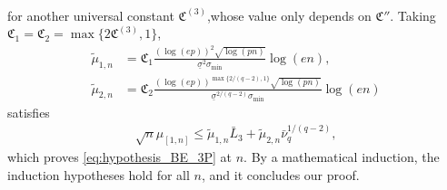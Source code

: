\documentclass[aos]{imsart}
\begin{document}
\begin{appendix}
\begin{equation*}
\begin{aligned}
\end{aligned}
\end{equation*}
for another universal constant $\mathfrak{C}^{(3)}$,whose value only depends on $\mathfrak{C}''$.
Taking $\mathfrak{C}_1 = \mathfrak{C}_2 = \max\{2 \mathfrak{C}^{(3)}, 1\}$,
\begin{equation*}
\begin{aligned}
    \tilde\mu_{1,n} 
    & = \mathfrak{C}_1 \frac{(\log(ep))^{2}\sqrt{\log(pn)}}{\underline\sigma^2\sigma_{\min}} \log\left(e n\right), \\
    \tilde\mu_{2,n}
    & = \mathfrak{C}_2 \frac{(\log(ep))^{\max\{2/(q-2),1\}}\sqrt{\log(pn)}}{\underline\sigma^{2/(q-2)} \sigma_{\min}} \log\left(e n\right)
\end{aligned}
\end{equation*}
satisfies
\begin{equation*}
\begin{aligned}
    \sqrt{n} \mu_{[1,n]}
    \leq \tilde\mu_{1,n} \bar{L}_{3}
    + \tilde\mu_{2,n} \bar\nu_{q}^{1/(q-2)},
\end{aligned}
\end{equation*}
which proves \eqref{eq:hypothesis_BE_3P} at $n$. By a mathematical induction, the induction hypotheses hold for all $n$, and it concludes our proof.


















\end{appendix}
\end{document}
